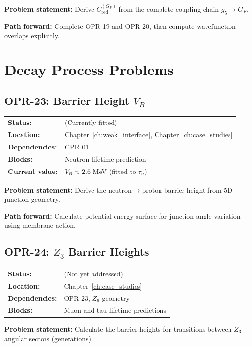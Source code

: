 \textbf{Problem statement:} Derive $C_{\text{red}}^{(G_F)}$ from the
complete coupling chain $g_5 \to G_F$.

\textbf{Path forward:} Complete OPR-19 and OPR-20, then compute
wavefunction overlaps explicitly.

\section{Decay Process Problems}

\subsection*{OPR-23: Barrier Height $V_B$}
\begin{tabular}{ll}
\textbf{Status:} & \tagCal{} (Currently fitted) \\
\textbf{Location:} & Chapter~\ref{ch:weak_interface}, Chapter~\ref{ch:case_studies} \\
\textbf{Dependencies:} & OPR-01 \\
\textbf{Blocks:} & Neutron lifetime prediction \\
\textbf{Current value:} & $V_B \approx 2.6$ MeV (fitted to $\tau_n$) \\
\end{tabular}

\textbf{Problem statement:} Derive the neutron$\to$proton barrier height
from 5D junction geometry.

\textbf{Path forward:} Calculate potential energy surface for junction
angle variation using membrane action.

\bigskip

\subsection*{OPR-24: $Z_3$ Barrier Heights}
\begin{tabular}{ll}
\textbf{Status:} & \tagOpen{} (Not yet addressed) \\
\textbf{Location:} & Chapter~\ref{ch:case_studies} \\
\textbf{Dependencies:} & OPR-23, $Z_6$ geometry \\
\textbf{Blocks:} & Muon and tau lifetime predictions \\
\end{tabular}

\textbf{Problem statement:} Calculate the barrier heights for transitions
between $Z_3$ angular sectors (generations).

